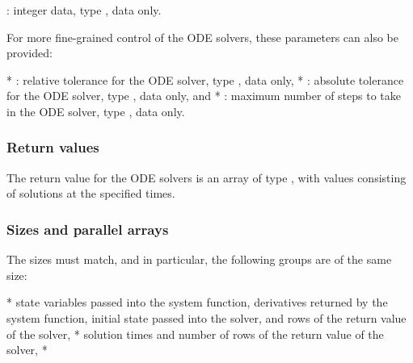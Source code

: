 \begin{description}
\begin{description}
\begin{description}
\begin{description}
\begin{description}
\begin{description}
\begin{description}
\begin{description}
\begin{description}
\begin{description}
\begin{description}
\begin{description}
\begin{description}
\begin{description}
\begin{description}
\begin{description}
\begin{description}
\begin{description}
\begin{description}
\begin{description}
\begin{description}
\begin{description}
\begin{description}
\begin{description}
\begin{description}
\begin{description}
\begin{description}
\begin{description}
\begin{description}
\begin{description}
\begin{description}
\begin{description}
\begin{description}
\begin{description}
\begin{description}
\begin{description}
\begin{description}
\begin{description}
\begin{description}
\begin{description}
\begin{description}
\begin{description}
\begin{description}
\begin{description}
\begin{description}
\begin{description}
\begin{description}
\begin{description}
\begin{description}
\begin{description}
\begin{description}
\begin{description}
\begin{description}
\begin{description}
\begin{description}
\begin{description}
\begin{description}
\begin{description}
\begin{description}
\begin{description}
\begin{description}
\begin{description}
\begin{description}
\begin{description}
\begin{description}
\begin{description}
\begin{description}
\begin{description}
\begin{description}
\begin{description}
\begin{description}
\begin{description}
\begin{description}
\begin{description}
\begin{description}
\begin{description}
\begin{description}
\begin{description}
\begin{description}
\begin{description}
\begin{description}
\begin{description}
\begin{description}
\begin{description}
: integer data, type , data only.

For more fine-grained control of the ODE solvers, these parameters can also be provided:

 *  : relative tolerance for the ODE   solver, type , data only,
 *  : absolute tolerance for the ODE   solver, type , data only, and
 *  : maximum number of steps to take in the   ODE solver, type , data only.

\subsubsection{Return values}

The return value for the ODE solvers is an array of type , with values consisting of solutions at the specified times.

\subsubsection{Sizes and parallel arrays}

The sizes must match, and in particular, the following groups are of the same size:

 * state variables passed into the system function,   derivatives returned by the system function, initial state passed   into the solver, and rows of the return value of the solver,
 * solution times and number of rows of the return value of the solver,
 * 
\end{description}
\end{description}
\end{description}
\end{description}
\end{description}
\end{description}
\end{description}
\end{description}
\end{description}
\end{description}
\end{description}
\end{description}
\end{description}
\end{description}
\end{description}
\end{description}
\end{description}
\end{description}
\end{description}
\end{description}
\end{description}
\end{description}
\end{description}
\end{description}
\end{description}
\end{description}
\end{description}
\end{description}
\end{description}
\end{description}
\end{description}
\end{description}
\end{description}
\end{description}
\end{description}
\end{description}
\end{description}
\end{description}
\end{description}
\end{description}
\end{description}
\end{description}
\end{description}
\end{description}
\end{description}
\end{description}
\end{description}
\end{description}
\end{description}
\end{description}
\end{description}
\end{description}
\end{description}
\end{description}
\end{description}
\end{description}
\end{description}
\end{description}
\end{description}
\end{description}
\end{description}
\end{description}
\end{description}
\end{description}
\end{description}
\end{description}
\end{description}
\end{description}
\end{description}
\end{description}
\end{description}
\end{description}
\end{description}
\end{description}
\end{description}
\end{description}
\end{description}
\end{description}
\end{description}
\end{description}
\end{description}
\end{description}
\end{description}
\end{description}
